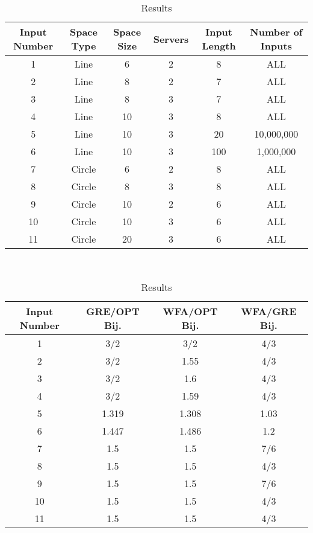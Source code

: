 \begin{table}[!htb]
    \begin{minipage}{.5\linewidth}
      \centering
      \begin{tabular}{|c|c|c|c|c|c|}
        \hline
        Input Number & Space Type & Space Size & Servers & Input Length & Number of Inputs\\
        \hline
        1 & Line & 6 & 2 & 8 & ALL \\
        \hline
        2 & Line & 8 & 2 & 7 & ALL \\
        \hline
        3 & Line & 8 & 3 & 7 & ALL\\
        \hline
        4 & Line & 10 & 3 & 8 & ALL\\
        \hline
        5 & Line & 10 & 3 & 20 & 10,000,000\\
        \hline
        6 & Line & 10 & 3 & 100 & 1,000,000\\
        \hline 
        7 & Circle & 6 & 2 & 8 & ALL\\
        \hline
        8 & Circle & 8 & 3 & 8 & ALL\\
        \hline
        9 & Circle & 10 & 2 & 6 & ALL\\
        \hline
        10 & Circle & 10 & 3 & 6 & ALL\\
        \hline
        11 & Circle & 20 & 3 & 6 & ALL \\
        \hline
    \end{tabular}
        \caption{Tests}
        \label{tab:tests}
    \end{minipage}%
    \\
    \begin{minipage}{.5\linewidth}
        \centering
        \begin{tabular}{|c|c|c|c|}
          \hline
          Input Number & GRE/OPT Bij. & WFA/OPT Bij. & WFA/GRE Bij.\\
          \hline
          1 & 3/2 & 3/2 & 4/3\\
          \hline
          2 & 3/2 & 1.55 & 4/3\\
          \hline
          3 & 3/2 & 1.6 & 4/3 \\
          \hline
          4 & 3/2 & 1.59 & 4/3 \\
          \hline
          5 & 1.319 & 1.308 & 1.03 \\
          \hline
          6 & 1.447 & 1.486 & 1.2 \\
          \hline
          7 & 1.5 & 1.5 & 7/6 \\
          \hline
          8 & 1.5 & 1.5 & 4/3 \\
          \hline
          9 & 1.5 & 1.5 & 7/6 \\
          \hline
          10 & 1.5 & 1.5 & 4/3 \\
          \hline
          11 & 1.5 & 1.5 & 4/3 \\
          \hline

      \end{tabular}
          \caption{Results}
          \label{tab:results}
    \end{minipage} 
\end{table}